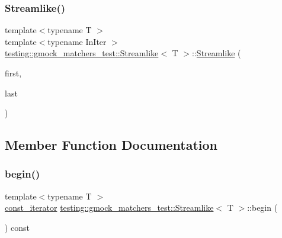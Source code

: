 \subsubsection{\texorpdfstring{Streamlike()}{Streamlike()}}
{\footnotesize\ttfamily template$<$typename T $>$ \\
template$<$typename In\+Iter $>$ \\
\mbox{\hyperlink{classtesting_1_1gmock__matchers__test_1_1Streamlike}{testing\+::gmock\+\_\+matchers\+\_\+test\+::\+Streamlike}}$<$ T $>$\+::\mbox{\hyperlink{classtesting_1_1gmock__matchers__test_1_1Streamlike}{Streamlike}} (\begin{DoxyParamCaption}\item[{In\+Iter}]{first,  }\item[{In\+Iter}]{last }\end{DoxyParamCaption})\hspace{0.3cm}{\ttfamily [inline]}}



\subsection{Member Function Documentation}
\mbox{\label{classtesting_1_1gmock__matchers__test_1_1Streamlike_a1ac125e14fd2358cdb727e0044ef7f01}} 
\subsubsection{\texorpdfstring{begin()}{begin()}}
{\footnotesize\ttfamily template$<$typename T $>$ \\
\mbox{\hyperlink{classtesting_1_1gmock__matchers__test_1_1Streamlike_a2eeb61dca56f70d0266f5f8ae91d2c7b}{const\+\_\+iterator}} \mbox{\hyperlink{classtesting_1_1gmock__matchers__test_1_1Streamlike}{testing\+::gmock\+\_\+matchers\+\_\+test\+::\+Streamlike}}$<$ T $>$\+::begin (\begin{DoxyParamCaption}{ }\end{DoxyParamCaption}) const\hspace{0.3cm}{\ttfamily [inline]}}

\mbox{\label{classtesting_1_1gmock__matchers__test_1_1Streamlike_a3e3aa6924974abcf7855dab1094bd860}} 
